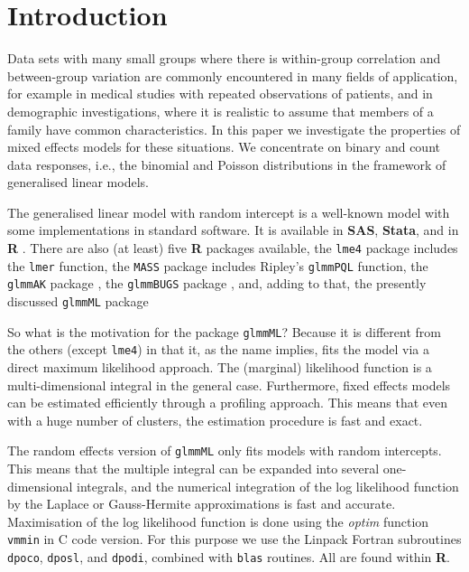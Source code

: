 \documentclass[a4paper,11pt]{article}
\begin{document}



\section{Introduction}

Data sets with many small groups where there is within-group correlation
and between-group variation are commonly encountered in many fields of
application, 
for example in medical studies with repeated observations of patients, and
in demographic investigations, where it is realistic to assume that members
of a family have common characteristics. In this paper we investigate the
properties of mixed effects models for these situations. We concentrate
on binary and count data responses, i.e., the binomial and
Poisson distributions in the framework of generalised linear models.

The generalised linear model with random intercept is a well-known model with
some implementations in standard software. It is available in 
{\bf SAS}, {\bf Stata}, and in {\bf R} \cite{R}. There are also (at
least) five {\bf R} packages available, the {\tt lme4} package \cite{lme4}
includes the {\tt lmer} function, the {\tt MASS}
package \cite{mass} includes Ripley's {\tt glmmPQL} function, the 
 {\tt glmmAK} package \cite{glmmAK}, the {\tt glmmBUGS} package
 \cite{glmmBUGS}, and, adding to 
that, the presently discussed {\tt glmmML} package \citep{glmmML} 

So what is the motivation for the package {\tt glmmML}? Because
it is different from the
others (except \texttt{lme4}) in that it, as the name implies, fits the
model via a direct maximum 
likelihood approach. The (marginal) likelihood function is a multi-dimensional
integral in the general case. Furthermore, fixed effects models can be
estimated efficiently through a profiling approach. This means that even
with a huge number of clusters, the estimation procedure is fast and exact.

The random effects version of {\tt glmmML}
only fits models with random intercepts. This means that the multiple
integral can be expanded into several one-dimensional integrals, and the
numerical integration of the log likelihood function by the Laplace or
Gauss-Hermite approximations is fast and accurate. Maximisation of the log
likelihood function is done using the \emph{optim} function {\tt vmmin} in
C code version. For 
this purpose we use the {\sc Linpack} 
Fortran subroutines {\tt dpoco}, {\tt dposl}, and {\tt dpodi},
combined with {\tt blas} routines. All are found within {\bf R}.
\end{document}
